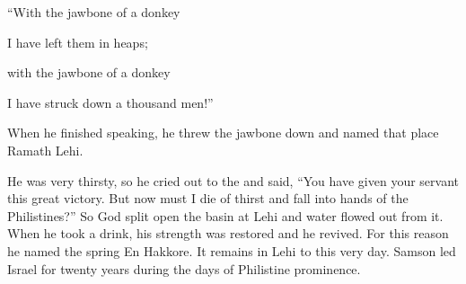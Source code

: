 {\par }{\Q “With the jawbone
of a donkey
\par }{\Q I have left them in heaps;
\par }{\Q with the jawbone
of a donkey
\par }{\Q I have struck
down a thousand
men!”
\par }{\PP {}When
he finished
speaking,
he threw
the jawbone
down and named
that place
Ramath Lehi.
\par }{\PP {}He was very
thirsty,
so he cried
out to
the {}
and said,
“You
have given
your servant
this
great
victory.
But now
must I die
of thirst
and fall
into hands
of the Philistines?”
So God
split open
the
basin
at Lehi
and water
flowed out
from
it. When he took a drink,
his strength
was restored
and he revived.
For this reason
he named
the spring En Hakkore.
It remains in Lehi
to this
very
day.
Samson led
Israel
for twenty
years
during the days
of Philistine prominence.

}
